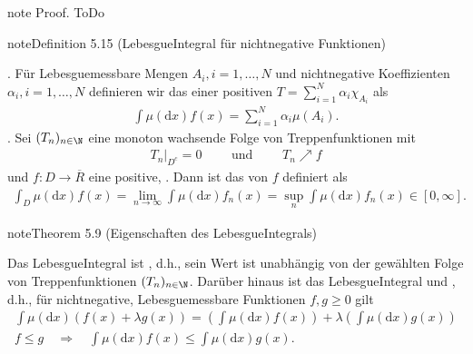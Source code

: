 \documentclass[letterpaper,10pt,english]{jupyterBook}
\begin{document}
\begin{sphinxadmonition}{note}
\sphinxAtStartPar
Proof. ToDo
\end{sphinxadmonition}
\label{masstheorie/lebesgue_integral:definition-5}
\begin{sphinxadmonition}{note}{Definition 5.15 (Lebesgue\sphinxhyphen{}Integral für nichtnegative Funktionen)}



. Für Lebesgue\sphinxhyphen{}messbare Mengen \(A_i, i=1,\ldots,N\) und nicht\sphinxhyphen{}negative Koeffizienten \(\alpha_i, i=1,\ldots,N\) definieren wir das  einer positiven  \(T = \sum_{i=1}^N \alpha_i \chi_{A_i}\) als
\begin{equation*}
\begin{split}\int \mu(\mathrm{d}x) f(x) = \sum_{i=1}^N \alpha_i \mu(A_i).\end{split}
\end{equation*}
. Sei \((T_n)_{n\in\N}\) eine monoton wachsende Folge von Treppenfunktionen mit
\begin{equation*}
\begin{split}T_n|_{D^c} = 0 \qquad \text{ und } \qquad T_n \nearrow f\end{split}
\end{equation*}
\sphinxAtStartPar
und \(f \colon D \rightarrow \overline{R}\) eine positive, .
Dann ist das  von \(f\) definiert als
\begin{equation*}
\begin{split}\int_D \mu(\mathrm{d}x) f(x) = \lim_{n\rightarrow \infty} \int \mu(\mathrm{d}x) f_n(x) = \sup_n \int \mu(\mathrm{d}x) f_n(x) \in [0,\infty].\end{split}
\end{equation*}\end{sphinxadmonition}
\label{masstheorie/lebesgue_integral:theorem-6}
\begin{sphinxadmonition}{note}{Theorem 5.9 (Eigenschaften des Lebesgue\sphinxhyphen{}Integrals)}



\sphinxAtStartPar
Das Lebesgue\sphinxhyphen{}Integral ist , d.h., sein Wert ist unabhängig von der gewählten Folge von Treppenfunktionen \((T_n)_{n\in\N}\).
Darüber hinaus ist das Lebesgue\sphinxhyphen{}Integral  und , d.h., für nichtnegative, Lebesgue\sphinxhyphen{}messbare Funktionen \(f,g \geq 0\) gilt
\begin{equation*}
\begin{split}\int \mu(\mathrm{d}x)(f(x) + \lambda g(x)) = \left( \int \mu(\mathrm{d}x) f(x) \right) + \lambda \left( \int \mu(\mathrm{d}x) g(x) \right)\\
f \leq g \quad \Rightarrow \quad \int \mu(\mathrm{d}x) f(x) \leq \int \mu(\mathrm{d}x) g(x).\end{split}
\end{equation*}\end{sphinxadmonition}
\end{document}

